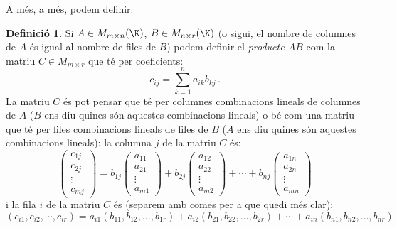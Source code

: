 \documentclass[a4paper,12pt,twoside]{article}
\newcommand{\1}{\mathbf{1}}
\newcommand{\0}{\mathbf{0}}
\theoremstyle{definition}
\newtheorem{definicio}[teorema]{Definició}
\theoremstyle{remark}
\begin{document}
A més, a més, podem definir:
\begin{definicio}
	Si $A \in M_{m\times n}(\K)$, $B \in M_{n\times r}(\K)$ (o sigui, el nombre de columnes de $A$ és igual al nombre de files de $B$) podem definir el \emph{producte $AB$} com la matriu $C\in M_{m\times r}$ que té per coeficients:
	$$
	c_{ij}=\sum_{k=1}^{n} a_{ik}b_{kj} \,.
	$$
	La matriu $C$ és pot pensar que té per columnes combinacions lineals de columnes de $A$ ($B$ ens diu quines són aquestes combinacions lineals) o bé com una matriu que té per files combinacions lineals de files de $B$ ($A$ ens diu quines són aquestes combinacions lineals): la columna $j$ de la matriu $C$ és:
	$$
	\begin{pmatrix}
	c_{1j}\\c_{2j}\\ \vdots \\ c_{mj} 
	\end{pmatrix} =
	b_{1j}	\begin{pmatrix}
	a_{11}\\a_{21}\\ \vdots \\ a_{m1} 
	\end{pmatrix} +
	b_{2j}	\begin{pmatrix}
    a_{12}\\a_{22}\\ \vdots \\ a_{m2} 
    \end{pmatrix} + \cdots +
	b_{nj}	\begin{pmatrix}
    a_{1n}\\a_{2n}\\ \vdots \\ a_{mn} 
    \end{pmatrix}
	$$
	i la fila $i$ de la matriu $C$ és (separem amb comes per a que quedi més clar):
	$$
	(c_{i1},c_{i2},\cdots,c_{ir})=
	a_{i1} (b_{11},b_{12},\dots,b_{1r})+
	a_{i2} (b_{21},b_{22},\dots,b_{2r})+ \cdots +
	a_{in} (b_{n1},b_{n2},\dots,b_{nr})
	$$
\end{definicio}
\end{document}
